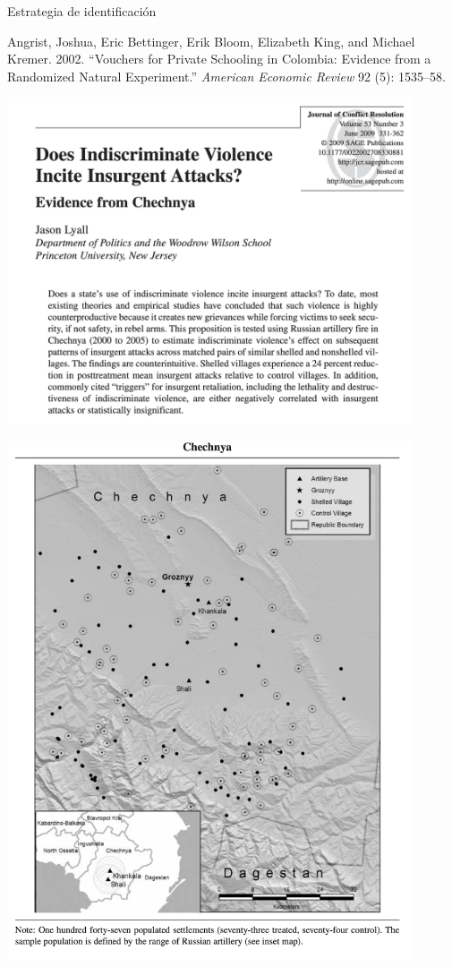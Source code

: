 \documentclass[
  ignorenonframetext,
]{beamer}
\begin{document}
\begin{frame}{Estrategia de identificación}
\begin{frame}{}
\begin{tiny}
Angrist, Joshua, Eric Bettinger, Erik Bloom, Elizabeth King, and Michael Kremer. 2002. “Vouchers for Private Schooling in Colombia: Evidence from a Randomized Natural Experiment.” \textit{American Economic Review} 92 (5): 1535–58.
\end{tiny}
\end{frame}

\begin{frame}{}
\protect\hypertarget{section-2}{}
\includegraphics[width=0.9\textwidth,height=\textheight]{figs/lyall2009.png}
\end{frame}

\begin{frame}{}
\protect\hypertarget{section-3}{}
\includegraphics[width=0.9\textwidth,height=\textheight]{figs/lyall20092.png}
\end{frame}


\end{frame}
\end{document}
